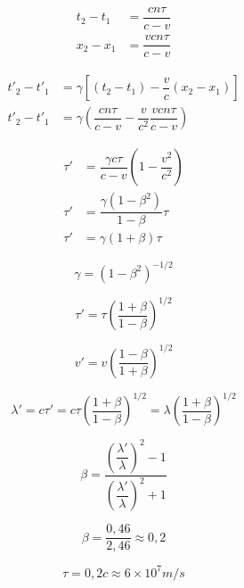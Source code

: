 \documentclass[../main]{subfiles}
\begin{document}
\begin{align*}
    t_2-t_1&=\dfrac{cn \tau}{c-v} \\
    x_2-x_1&=\dfrac{vcn \tau}{c-v}
\end{align*}

\begin{align}
    t'_2-t'_1&=\gamma\left[ (t_2-t_1)- \dfrac{v}{c}(x_2-x_1) \right] \tag{por T. Lorentz} \\
    t'_2-t'_1&=\gamma \left(  \dfrac{cn \tau}{c-v}-\dfrac{v}{c^2}\dfrac{vcn \tau}{c-v} \right) \nonumber
\end{align}

\begin{align}
    \tau'&=\dfrac{\gamma c\tau}{c-v} \left( 1-\dfrac{v^2}{c^2}\right) \nonumber \\
    \tau'&=\dfrac{\gamma(1-\beta^2)}{1-\beta}\tau \tag{$v/c=\beta$} \\
    \tau'&=\gamma(1+\beta)\tau \nonumber
\end{align}

\begin{equation*}
    \gamma=(1-\beta^2)^{-1/2}
\end{equation*}

\begin{equation}
    \tau'=\tau \left( \dfrac{1+\beta}{1-\beta} \right)^{1/2} 
\end{equation}

\begin{equation}
    v'=v \left( \dfrac{1-\beta}{1+\beta} \right)^{1/2}
\end{equation}

\begin{equation*}
    \lambda'=c \tau'=c \tau \left( \dfrac{1+\beta}{1-\beta} \right)^{1/2}=\lambda \left( \dfrac{1+\beta}{1-\beta}\right)^{1/2}
\end{equation*}

\begin{equation}
    \beta=\dfrac{\left(\dfrac{\lambda'}{\lambda}\right)^{2}-1}{\left(\dfrac{\lambda'}{\lambda}\right)^{2}+1}
\end{equation}

\begin{equation*}
    \beta=\dfrac{0,46}{2,46}\approx 0,2
\end{equation*}

\begin{equation*}
    \tau=0,2c \approx 6 \times 10^7 m/s
\end{equation*}
\end{document}
